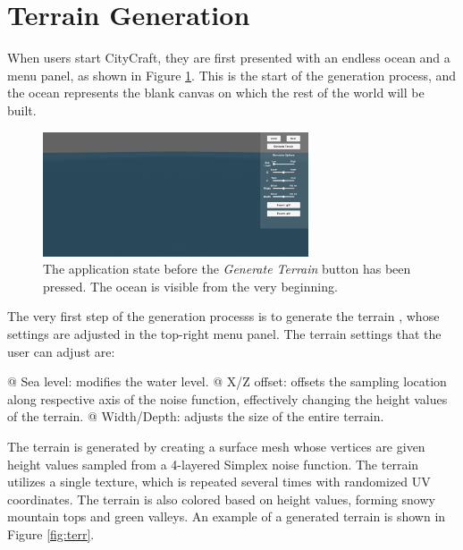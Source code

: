 \section{Terrain Generation}

When users start CityCraft, they are first presented with an endless ocean and a menu panel, as shown in Figure \ref{fig:no_terr}.
This is the start of the generation process, and the ocean represents the blank canvas on which the rest of the world will be built.

\begin{figure}[H]
  \centering

  \includegraphics[width=0.7\textwidth]{figure/terrain_not_generated.png}
  \caption{The application state before the \textit{Generate Terrain} button has been pressed. The ocean is visible from the very beginning.}

  \label{fig:no_terr}
\end{figure}

The very first step of the generation processs is to generate the terrain
, whose settings are adjusted in the top-right menu panel.
The terrain settings that the user can adjust are:
\begin{easylist}
  @ Sea level: modifies the water level.
  @ X/Z offset: offsets the sampling location along respective axis of the noise function, effectively changing the height values of the terrain.
  @ Width/Depth: adjusts the size of the entire terrain.
\end{easylist}

The terrain is generated by creating a surface mesh whose vertices are given height values sampled from a 4-layered Simplex noise function.
The terrain utilizes a single texture, which is repeated several times with randomized UV coordinates.
The terrain is also colored based on height values, forming snowy mountain tops and green valleys.
An example of a generated terrain is shown in Figure \ref{fig:terr}.

